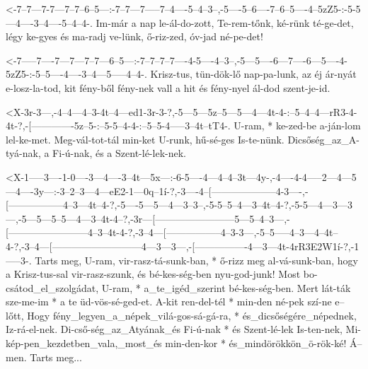 
  {<-7--7---7-7---7--7--6--5---:-7--7---7-----7--4----5--4--3--,-5----5--6----7--6--5----4--5zZ5-:-5-5---4----3--4----5--4--4-.}
  {  Im-már a nap le-ál-do-zott, Te-rem-tőnk, ké-rünk té-ge-det, légy ke-gyes és ma-radj ve-lünk,  ő-riz-zed, óv-jad  né-pe-det!}

  {<-7-----7----7---7---7--7---6--5---:-7--7--7--7----4-5----4--3--,-5---5----6---7----6---5----4-5zZ5-:-5--5----4----3--4---5-----4--4-.}
  {  Krisz-tus, tün-dök-lő nap-pa-lunk, az éj ár-nyát e-losz-la-tod, kit fény-ből fény-nek vall a hit    és fény-nyel ál-dod szent-je-id.}



  {<X-3r-3---,-4--4---4--3-4t--4---ed1-3r-3-?,-5---5---5z--5---5---4---4t-4-:--5--4--4---rR3-4-4t-?,-[-------------5z--5-:--5-5--4-4-:--5--5-4-----3--4t--tT4-.}
  {   U-ram, * ke-zed-be a-ján-lom lel-ke-met. Meg-vál-tot-tál min-ket U-runk, hű-sé-ges Is-te-nünk. Dicsőség_az_A-tyá-nak, a Fi-ú-nak, és a Szent-lé-lek-nek.}

  {<X-1-----3----1-0----3---4----3--4t---5x---:-6-5----4---4--4--3t---4y-,-4----4-4-----2---4---5---4----3y---:-3--2--3---4---eE2-1---0q--1í-?,-3----4--[--------------------4-3----,-[-----------------4--3---4t--4-?,-5----5---5---4---3--3--,-5-5--5--4---3--4t--4-?,-5-5---4---3---3---,-5---5---5--5---4---3--4t-4--?,-3r---[------------------------5---5--4--3---,-[------------------------4--3--4t-4-?,-3--4---[-----------------4--3-3---,-5--5-----4--3---4--4t--4-?,-3--4---[---------------------------4---3---3---,-[----------------4---3---4t-4rR3E2W1í-?,-1-----3-.}
  {   Tarts meg, U-ram, vir-rasz-tá-sunk-ban, * ő-rizz meg al-vá-sunk-ban, hogy a Krisz-tus-sal vir-rasz-szunk, és bé-kes-ség-ben nyu-god-junk! Most bo-csátod_el_szolgádat, U-ram, * a_te_igéd_szerint bé-kes-ség-ben. Mert lát-ták sze-me-im * a te üd-vös-sé-ged-et.  A-kit ren-del-tél * min-den né-pek szí-ne e--lőtt, Hogy fény_legyen_a_népek_vilá-gos-sá-gá-ra, * és_dicsőségére_népednek, Iz-rá-el-nek. Di-cső-ség_az_Atyának_és Fi-ú-nak * és Szent-lé-lek Is-ten-nek, Mi-kép-pen_kezdetben_vala,_most_és min-den-kor * és_mindörökkön_ö-rök-ké! Á--men.         Tarts meg...}


